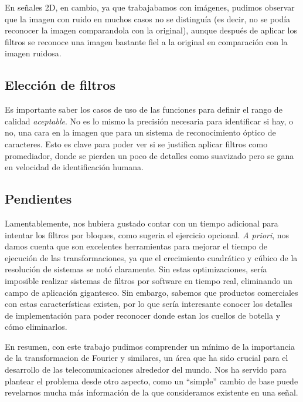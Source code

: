 En se\~nales 2D, en cambio, ya que trabajabamos con im\'agenes, pudimos observar que la imagen con ruido en muchos
casos no se distingu\'ia (es decir, no se pod\'ia reconocer la imagen comparandola con la original), aunque despu\'es
de aplicar los filtros se reconoce una imagen bastante fiel a la original en comparaci\'on con la imagen ruidosa.

\subsection{Elecci\'on de filtros}

Es importante saber los casos de uso de las funciones para definir el rango de calidad \textit{aceptable}. No es lo mismo
la precisi\'on necesaria para identificar si hay, o no, una cara en la imagen que para un sistema de reconocimiento \'optico
de caracteres. Esto es clave para poder ver si se justifica aplicar filtros como promediador, donde se pierden un poco de detalles como suavizado
pero se gana en velocidad de identificaci\'on humana.

\subsection{Pendientes}

Lamentablemente, nos hubiera gustado contar con un tiempo adicional para intentar los filtros por bloques, como sugeria el ejercicio
opcional. \textit{A priori}, nos damos cuenta que son excelentes herramientas para mejorar el tiempo de ejecuci\'on
de las transformaciones, ya que el crecimiento cuadr\'atico y c\'ubico de la resoluci\'on de sistemas se not\'o claramente.
Sin estas optimizaciones, ser\'ia imposible realizar sistemas de filtros por software en tiempo real, eliminando un campo de 
aplicaci\'on gigantesco. Sin embargo, sabemos que productos comerciales con estas caracter\'isticas existen, por lo que
ser\'ia interesante conocer los detalles de implementaci\'on para poder reconocer donde estan los cuellos de botella y c\'omo
eliminarlos.

En resumen, con este trabajo pudimos comprender un m\'inimo de la importancia de la transformacion de Fourier y similares,
un \'area que ha sido crucial para el desarrollo de las telecomunicaciones alrededor del mundo. Nos ha servido para plantear
el problema desde otro aspecto, como un ``simple'' cambio de base puede revelarnos mucha m\'as informaci\'on de la que 
consideramos existente en una se\~nal. 

